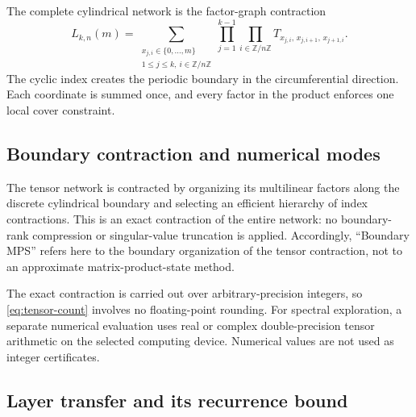 \documentclass[11pt,a4paper]{article}
\theoremstyle{definition}
\begin{document}
The complete cylindrical network is the factor-graph contraction
\begin{equation}\label{eq:tensor-count}
L_{k,n}(m)=
\sum_{\substack{x_{j,i}\in\{0,\ldots,m\}\\
1\le j\le k,\ i\in\mathbb{Z}/n\mathbb{Z}}}
\prod_{j=1}^{k-1}\prod_{i\in\mathbb{Z}/n\mathbb{Z}}
T_{x_{j,i},\,x_{j,i+1},\,x_{j+1,i}}.
\end{equation}
The cyclic index creates the periodic boundary in the circumferential direction. Each coordinate is summed once, and every factor in the product enforces one local cover constraint.

\subsection{Boundary contraction and numerical modes}

The tensor network is contracted by organizing its multilinear factors
along the discrete cylindrical boundary and selecting an efficient
hierarchy of index contractions. This is an exact contraction of the
entire network: no boundary-rank compression or singular-value
truncation is applied. Accordingly, ``Boundary MPS'' refers here to the
boundary organization of the tensor contraction, not to an approximate
matrix-product-state method.

The exact contraction is carried out over arbitrary-precision integers,
so \eqref{eq:tensor-count} involves no floating-point rounding. For
spectral exploration, a separate numerical evaluation uses real or
complex double-precision tensor arithmetic on the selected computing
device. Numerical values are not used as integer certificates.

\subsection{Layer transfer and its recurrence bound}
\end{document}
